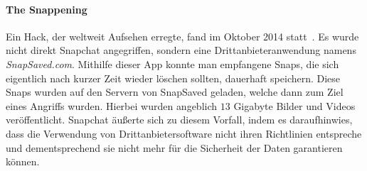 \paragraph{The Snappening} Ein Hack, der weltweit Aufsehen erregte, fand
im Oktober 2014 statt~\cite{sc_snappening}. Es wurde nicht direkt Snapchat
angegriffen, sondern eine Drittanbieteranwendung namens \emph{SnapSaved.com}.
Mithilfe dieser App konnte man empfangene Snaps, die sich eigentlich nach
kurzer Zeit wieder l\"oschen sollten, dauerhaft speichern. Diese Snaps wurden
auf den Servern von SnapSaved geladen, welche dann zum Ziel eines Angriffs
wurden. Hierbei wurden angeblich $13$ Gigabyte\cite{sc_snappening} Bilder und
Videos ver\"offentlicht. Snapchat \"au{\ss}erte sich zu diesem Vorfall, indem
es daraufhinwies, dass die Verwendung von Drittanbietersoftware nicht ihren
Richtlinien entspreche und dementsprechend sie nicht mehr f\"ur die Sicherheit
der Daten garantieren k\"onnen.
